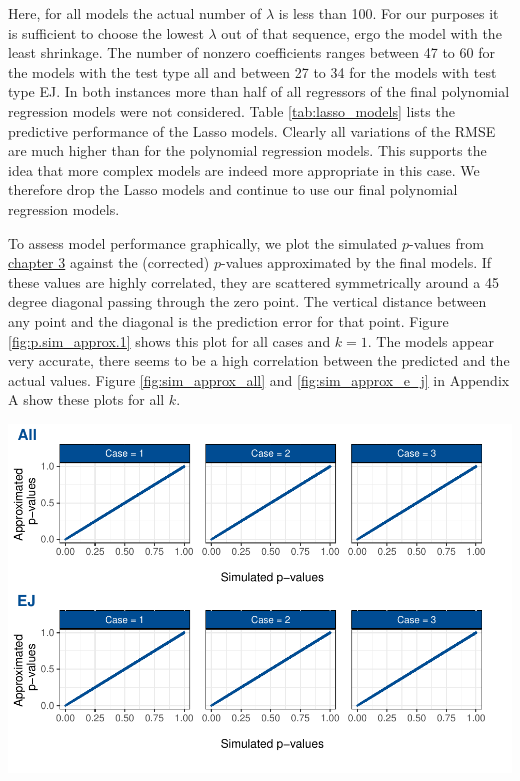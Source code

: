 \documentclass[12pt,a4paper]{article}
\let\origfigure\figure
\let\endorigfigure\endfigure
\renewenvironment{figure}[1][2] {
    \expandafter\origfigure\expandafter[H]
} {
    \endorigfigure
}
\begin{document}
Here, for all models the actual number of \(\lambda\) is less than 100.
For our purposes it is sufficient to choose the lowest \(\lambda\) out
of that sequence, ergo the model with the least shrinkage. The number of
nonzero coefficients ranges between 47 to 60 for the models with the
test type all and between 27 to 34 for the models with test type EJ. In
both instances more than half of all regressors of the final polynomial
regression models were not considered. Table \ref{tab:lasso_models}
lists the predictive performance of the \ac{Lasso} models. Clearly all
variations of the \ac{RMSE} are much higher than for the polynomial
regression models. This supports the idea that more complex models are
indeed more appropriate in this case. We therefore drop the \ac{Lasso}
models and continue to use our final polynomial regression models.

To assess model performance graphically, we plot the simulated
\(p\)-values from \protect\hyperlink{simulation}{chapter 3} against the
(corrected) \(p\)-values approximated by the final models. If these
values are highly correlated, they are scattered symmetrically around a
45 degree diagonal passing through the zero point. The vertical distance
between any point and the diagonal is the prediction error for that
point. Figure \ref{fig:p.sim_approx.1} shows this plot for all cases and
\(k = 1\). The models appear very accurate, there seems to be a high
correlation between the predicted and the actual values. Figure
\ref{fig:sim_approx_all} and \ref{fig:sim_approx_e_j} in Appendix A show
these plots for all \(k\).

\begin{figure}
\centering
\includegraphics{p_approx_paper_files/figure-latex/p.sim_aprox.k1-1.pdf}
\caption{\label{fig:p.sim_approx.1} Simulated \(p\)-values plotted
against \(p\)-values approximated by final (corrected) models, exemplary
for \(k = 1\).}
\end{figure}
\end{document}
